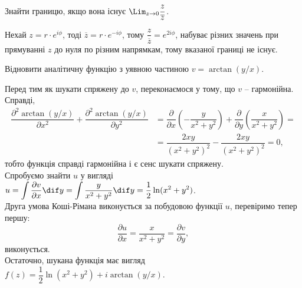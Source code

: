 \begin{problem}
    Знайти границю, якщо вона існує $\Lim_{z\to0}\dfrac{z}{\overline{z}}$.
\end{problem}

\begin{solution}
    Нехай $z = r \cdot e^{i\phi}$, тоді $\overline{z} = r \cdot e^{-i\phi}$, тому $\dfrac{z}{\overline{z}} = e^{2i\phi}$, набуває різних значень при прямуванні $z$ до нуля по різним напрямкам, тому вказаної границі не існує.
\end{solution}

\begin{problem}
    Відновити аналітичну функцію з уявною частиною $v = \arctan(y/x)$.
\end{problem}

\begin{solution}
    Перед тим як шукати спряжену до $v$, переконаємося у тому, що $v$ -- гармонійна. Справді,
    \begin{align*}
        \dfrac{\partial^2\arctan(y/x)}{\partial x^2} + \dfrac{\partial^2 \arctan(y/x)}{\partial y^2} &= \dfrac{\partial}{\partial x} \left(-\dfrac {y}{x^2 + y^2}\right) + \dfrac{\partial}{\partial y} \left(\dfrac{x}{x^2+y^2}\right) = \\
        &= \dfrac{2 x y}{(x^2 + y^2)^2} -\dfrac{2 x y}{(x^2 + y^2)^2} = 0,
    \end{align*}
    тобто функція справді гармонійна і є сенс шукати спряжену. \\
    
    Спробуємо знайти $u$ у вигляді $u = \displaystyle\int \dfrac{\partial v}{\partial x} \dif y = \int \dfrac{y}{x^2 + y^2}\dif y = \dfrac12 \ln(x^2 + y^2)$. \\
    
    Друга умова Коші-Рімана виконується за побудовою функції $u$, перевіримо тепер першу:
    \[ \dfrac{\partial u}{\partial x} = \dfrac{x}{x^2+y^2} = \dfrac{\partial v}{\partial y}, \]
    виконується. \\
    
    Остаточно, шукана функція має вигляд $f(z) = \dfrac12 \ln(x^2+y^2) + i \arctan(y/x)$.
    
\end{solution}